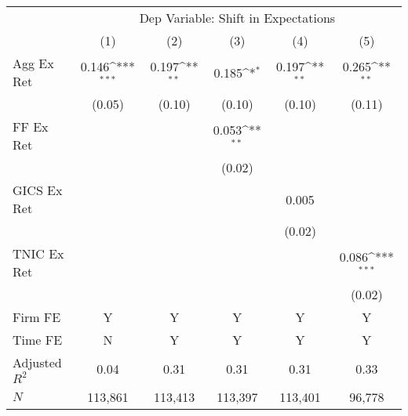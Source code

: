          {         \def\sym#1{\ifmmode^{#1}\else\(^{#1}\)\fi}         \begin{tabular}{l*{5}{c}}         \toprule          &\multicolumn{5}{c}{Dep Variable: Shift in Expectations} \\         \cmidrule(lr){2-6}           &\multicolumn{1}{c}{(1)}&\multicolumn{1}{c}{(2)} &\multicolumn{1}{c}{(3)}         &\multicolumn{1}{c}{(4)}        &\multicolumn{1}{c}{(5)} \\         
\midrule
Agg Ex Ret  &       0.146\sym{***}&       0.197\sym{**} &       0.185\sym{*}  &       0.197\sym{**} &       0.265\sym{**} \\
            &      (0.05)         &      (0.10)         &      (0.10)         &      (0.10)         &      (0.11)         \\
FF Ex Ret   &                     &                     &       0.053\sym{**} &                     &                     \\
            &                     &                     &      (0.02)         &                     &                     \\
GICS Ex Ret &                     &                     &                     &       0.005         &                     \\
            &                     &                     &                     &      (0.02)         &                     \\
TNIC Ex Ret &                     &                     &                     &                     &       0.086\sym{***}\\
            &                     &                     &                     &                     &      (0.02)         \\
         \cmidrule(lr){1-6}          \multicolumn{1}{l}{Firm FE} & Y&Y&Y&Y&Y \\         \multicolumn{1}{l}{Time FE} & N&Y&Y&Y&Y \\         
Adjusted $R^2$&        0.04         &        0.31         &        0.31         &        0.31         &        0.33         \\
$N$         &     113,861         &     113,413         &     113,397         &     113,401         &      96,778         \\
\bottomrule                         \end{tabular}                         }
